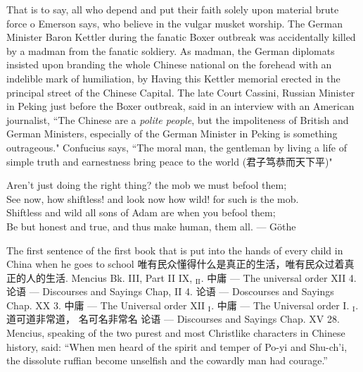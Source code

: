 \begin{thebibliography}{30}
     That is to say, all who depend and put their faith solely upon material brute force o Emerson says, who believe in the vulgar musket worship.
     The German Minister Baron Kettler during the fanatic Boxer outbreak was accidentally killed by a madman from the fanatic soldiery. As madman, the German diplomats insisted upon branding the whole Chinese national on the forehead with an indelible mark of humiliation, by Having this Kettler memorial erected in the principal street of the Chinese Capital. The late Court Cassini, Russian Minister in Peking just before the Boxer outbreak, said in an interview with an American journalist, ``The Chinese are a \emph{polite people}, but the impoliteness of British and German Ministers, especially of the German Minister in Peking is something outrageous."
     Confucius says, ``The moral man, the gentleman by living a life of simple truth and earnestness bring peace to the world (君子笃恭而天下平)" 
     \begin{center}
    Aren't just doing the right thing? \hfill the mob we must befool them;\\
    See now, how shiftless! and look now how wild! for such is the mob.\\
    Shiftless and wild all sons of Adam are when you befool them;\\
    Be but honest and true, and thus make human, them all. \hfill --- G\"othe\\
\end{center} 
     The first sentence of the first book that is put into the hands of every child in China when he goes to school
     唯有民众懂得什么是真正的生活，唯有民众过着真正的人的生活.
     Mencius Bk. III, Part II IX, $_{\text{II}}$.
     中庸 --- The universal order XII 4.
     论语 --- Discourses and Sayings Chap, II 4.
     论语 --- Doscourses and Sayings Chap. XX 3.
     中庸 --- The Universal order XII $_{\text{I}}$.
     中庸 --- The Universal order I. $_\text{I}$.
     道可道非常道， 名可名非常名
     论语 --- Discourses and Sayings Chap. XV 28.
     Mencius, speaking of the two purest and most Christlike characters in Chinese history, said: ``When men heard of the spirit and temper of Po-yi and Shu-ch'i, the dissolute ruffian become unselfish and the cowardly man had courage.''

\end{thebibliography}
